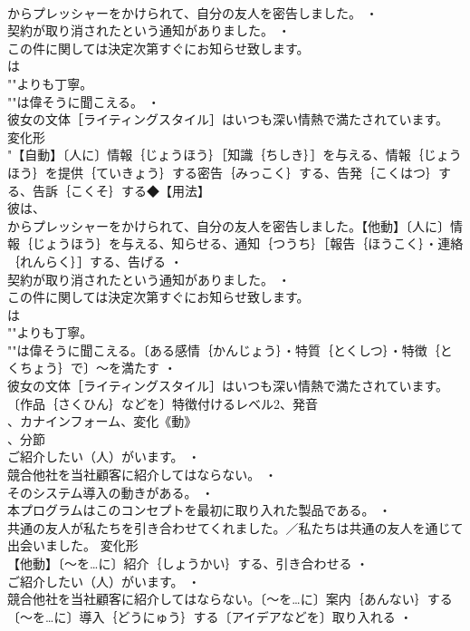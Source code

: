 \documentclass[8pt]{extreport}
\begin{document}
\begin{CJK}{UTF8}{min}
\\	からプレッシャーをかけられて、自分の友人を密告しました。 ・
\\	契約が取り消されたという通知がありました。 ・
\\	この件に関しては決定次第すぐにお知らせ致します。
\\	は 
\\	""よりも丁寧。
\\	""は偉そうに聞こえる。 ・
\\	彼女の文体［ライティングスタイル］はいつも深い情熱で満たされています。
\\	変化形 
\\	"【自動】〔人に〕情報｛じょうほう｝［知識｛ちしき｝］を与える、情報｛じょうほう｝を提供｛ていきょう｝する密告｛みっこく｝する、告発｛こくはつ｝する、告訴｛こくそ｝する◆【用法】
\\	彼は、
\\	からプレッシャーをかけられて、自分の友人を密告しました。【他動】〔人に〕情報｛じょうほう｝を与える、知らせる、通知｛つうち｝［報告｛ほうこく｝・連絡｛れんらく｝］する、告げる ・
\\	契約が取り消されたという通知がありました。 ・
\\	この件に関しては決定次第すぐにお知らせ致します。
\\	は 
\\	""よりも丁寧。
\\	""は偉そうに聞こえる。〔ある感情｛かんじょう｝・特質｛とくしつ｝・特徴｛とくちょう｝で〕～を満たす ・
\\	彼女の文体［ライティングスタイル］はいつも深い情熱で満たされています。〔作品｛さくひん｝などを〕特徴付けるレベル2、発音
\\	、カナインフォーム、変化《動》
\\	、分節
\\	ご紹介したい（人）がいます。 ・
\\	競合他社を当社顧客に紹介してはならない。 ・
\\	そのシステム導入の動きがある。 ・
\\	本プログラムはこのコンセプトを最初に取り入れた製品である。 ・
\\	共通の友人が私たちを引き合わせてくれました。／私たちは共通の友人を通じて出会いました。	変化形 
\\	【他動】〔～を…に〕紹介｛しょうかい｝する、引き合わせる ・
\\	ご紹介したい（人）がいます。 ・
\\	競合他社を当社顧客に紹介してはならない。〔～を…に〕案内｛あんない｝する〔～を…に〕導入｛どうにゅう｝する〔アイデアなどを〕取り入れる ・

\end{CJK}
\end{document}
